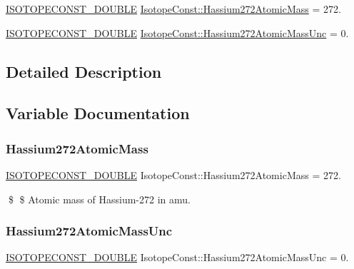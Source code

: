 \begin{DoxyCompactItemize}
\item 
\mbox{\hyperlink{group___isotope_const-_macros_ga8f45a7272ce02c0b4c65c44636ed719a}{I\+S\+O\+T\+O\+P\+E\+C\+O\+N\+S\+T\+\_\+\+D\+O\+U\+B\+LE}} \mbox{\hyperlink{group___isotope_const-_hassium-_hs272_ga6a32dd8fce472196b22fd71d0f50d03d}{Isotope\+Const\+::\+Hassium272\+Atomic\+Mass}} = 272.
\item 
\mbox{\hyperlink{group___isotope_const-_macros_ga8f45a7272ce02c0b4c65c44636ed719a}{I\+S\+O\+T\+O\+P\+E\+C\+O\+N\+S\+T\+\_\+\+D\+O\+U\+B\+LE}} \mbox{\hyperlink{group___isotope_const-_hassium-_hs272_ga02130535c310f93fdbbcb8dd020afe1f}{Isotope\+Const\+::\+Hassium272\+Atomic\+Mass\+Unc}} = 0.
\end{DoxyCompactItemize}


\subsection{Detailed Description}


\subsection{Variable Documentation}
\mbox{\label{group___isotope_const-_hassium-_hs272_ga6a32dd8fce472196b22fd71d0f50d03d}} 
\subsubsection{\texorpdfstring{Hassium272\+Atomic\+Mass}{Hassium272AtomicMass}}
{\footnotesize\ttfamily \mbox{\hyperlink{group___isotope_const-_macros_ga8f45a7272ce02c0b4c65c44636ed719a}{I\+S\+O\+T\+O\+P\+E\+C\+O\+N\+S\+T\+\_\+\+D\+O\+U\+B\+LE}} Isotope\+Const\+::\+Hassium272\+Atomic\+Mass = 272.}

\$ \$ Atomic mass of Hassium-\/272 in amu. \mbox{\label{group___isotope_const-_hassium-_hs272_ga02130535c310f93fdbbcb8dd020afe1f}} 
\subsubsection{\texorpdfstring{Hassium272\+Atomic\+Mass\+Unc}{Hassium272AtomicMassUnc}}
{\footnotesize\ttfamily \mbox{\hyperlink{group___isotope_const-_macros_ga8f45a7272ce02c0b4c65c44636ed719a}{I\+S\+O\+T\+O\+P\+E\+C\+O\+N\+S\+T\+\_\+\+D\+O\+U\+B\+LE}} Isotope\+Const\+::\+Hassium272\+Atomic\+Mass\+Unc = 0.}

